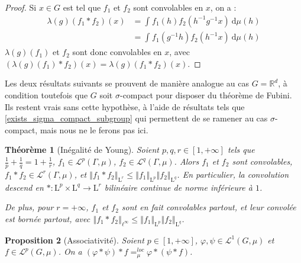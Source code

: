 \documentclass[a4paper,12pt]{article}
\newtheorem{theorem}{Théorème}[section]
\newtheorem{proposition}[theorem]{Proposition}
\newcommand{\R}{\mathbb{R}}
\newcommand{\norm}[1]{\left\Vert #1\right\Vert}
\newcommand{\integral}[4]{\int_{#1}^{#2} #3~\mathrm{d}#4}
\newcommand{\inv}{^{-1}}
\begin{document}
\begin{proof}
    Si $x\in G$ est tel que $f_1$ et $f_2$ sont convolables en $x$, on a :
    \begin{align*}
        \lambda(g)(f_1\ast f_2)(x) 
            &= \integral{}{}{f_1(h)f_2(h\inv g\inv x)}{\mu(h)} \\
            &= \integral{}{}{f_1(g\inv h)f_2(h\inv x)}{\mu(h)} 
    \end{align*}
    $\lambda(g)(f_1)$ et $f_2$ sont donc convolables en $x$, avec $(\lambda(g)(f_1)\ast f_2)(x) = \lambda(g)(f_1\ast f_2)(x)$.
\end{proof}

Les deux résultats suivants se prouvent de manière analogue au cas $G = \R^d$, à condition toutefois que 
$G$ soit $\sigma$-compact pour disposer du théorème de Fubini. Ils restent vrais sans cette hypothèse,
à l'aide de résultats tels que \ref{exists_sigma_compact_subgroup} qui permettent de se ramener au cas $\sigma$-compact,
mais nous ne le ferons pas ici. 

\begin{theorem}[Inégalité de Young]\label{young}
    Soient $p, q, r\in[1, +\infty]$ tels que $\frac1p + \frac1q = 1 + \frac1r$, $f_1\in\mathscr{L}^p(\Gamma, \mu)$,
    $f_2\in\mathscr{L}^q(\Gamma, \mu)$. Alors $f_1$ et $f_2$ sont convolables, $f_1\ast f_2\in\mathscr{L}^r(\Gamma, \mu)$,
    et $\norm{f_1\ast f_2}_{\mathrm{L}^r} \leq \norm{f_1}_{\mathrm{L}^p} \norm{f_2}_{\mathrm{L}^q}$. En particulier, 
    la convolution descend en $\ast : \mathrm{L}^p \times \mathrm{L}^q \to \mathrm{L}^r$ bilinéaire continue de norme inférieure à $1$.

    De plus, pour $r = +\infty$, $f_1$ et $f_2$ sont en fait convolables \emph{partout}, et leur convolée 
    est bornée \emph{partout}, avec $\norm{f_1\ast f_2}_{\ell^\infty} \leq \norm{f_1}_{\mathrm{L}^p} \norm{f_2}_{\mathrm{L}^q}$.
\end{theorem}

\begin{proposition}[Associativité]\label{conv_assoc}
    Soient $p\in[1, +\infty]$, $\varphi, \psi \in\mathscr{L}^1(G, \mu)$ et $f\in\mathscr{L}^p(G, \mu)$.
    On a $(\varphi \ast \psi) \ast f =_{\mu}^{loc} \varphi \ast (\psi \ast f)$.
\end{proposition}
\end{document}

